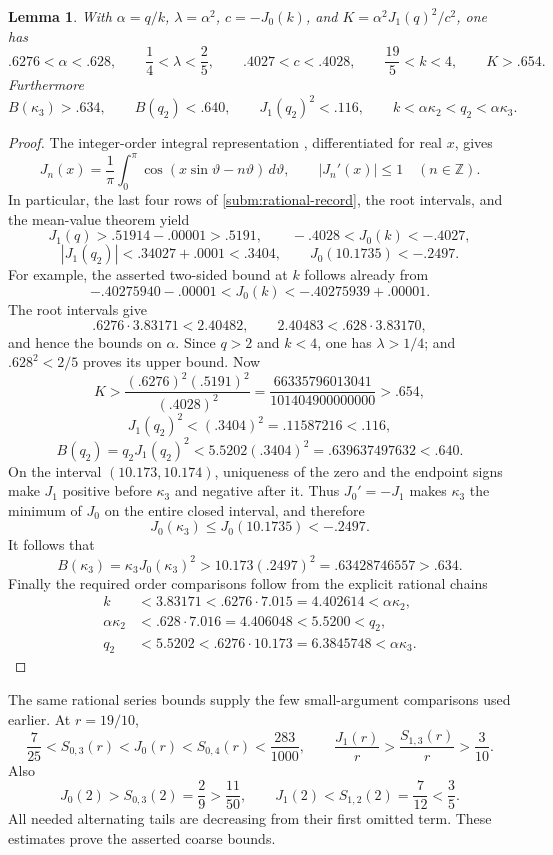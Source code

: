 \documentclass[11pt]{article}
\newtheorem{lemma}[theorem]{Lemma}
\theoremstyle{remark}
\begin{document}
\begin{lemma}\label{gm:coarse}
With $\alpha=q/k$, $\lambda=\alpha^2$, $c=-J_0(k)$, and
$K=\alpha^2J_1(q)^2/c^2$, one has
\[
 .6276<\alpha<.628,\qquad \frac14<\lambda<\frac25,
 \qquad .4027<c<.4028,\qquad \frac{19}5<k<4,
 \qquad K>.654.
\]
Furthermore
\[
 B(\kappa_3)>.634,\qquad B(q_2)<.640,\qquad
 J_1(q_2)^2<.116,
 \qquad k<\alpha\kappa_2<q_2<\alpha\kappa_3.
\]
\end{lemma}
\begin{proof}
The integer-order integral representation
\cite[Eq.~10.9.2]{DLMF}, differentiated for real $x$, gives
\[
 J_n(x)=\frac1\pi\int_0^\pi
       \cos(x\sin\vartheta-n\vartheta)\,d\vartheta,
 \qquad |J_n'(x)|\le1\quad(n\in\mathbb Z).
\]
In particular, the last four rows of
\eqref{subm:rational-record}, the root intervals, and the mean-value
theorem yield
\[
 J_1(q)>.51914-.00001>.5191,\qquad
 -.4028<J_0(k)<-.4027,
\]
\[
 |J_1(q_2)|<.34027+.0001<.3404,\qquad
 J_0(10.1735)<-.2497.
\]
For example, the asserted two-sided bound at $k$ follows already from
\[
 -.40275940-.00001<J_0(k)
                  <-.40275939+.00001.
\]
The root intervals give
\[
 .6276\cdot3.83171<2.40482,
 \qquad 2.40483<.628\cdot3.83170,
\]
and hence the bounds on $\alpha$.  Since $q>2$ and $k<4$, one has
$\lambda>1/4$; and $.628^2<2/5$ proves its upper bound.  Now
\[
 K>\frac{(.6276)^2(.5191)^2}{(.4028)^2}
 =\frac{66335796013041}{101404900000000}>.654,
\]
\[
 J_1(q_2)^2<(.3404)^2=.11587216<.116,
\]
\[
 B(q_2)=q_2J_1(q_2)^2
 <5.5202(.3404)^2=.639637497632<.640.
\]
On the interval $(10.173,10.174)$, uniqueness of the zero and the
endpoint signs make $J_1$ positive before $\kappa_3$ and negative
after it.  Thus $J_0'=-J_1$ makes $\kappa_3$ the minimum of $J_0$
on the entire closed interval, and therefore
\[
 J_0(\kappa_3)\le J_0(10.1735)<-.2497.
\]
It follows that
\[
 B(\kappa_3)=\kappa_3J_0(\kappa_3)^2
 >10.173(.2497)^2=.63428746557>.634.
\]
Finally the required order comparisons follow from the explicit
rational chains
\[
\begin{aligned}
 k&<3.83171<.6276\cdot7.015=4.402614<\alpha\kappa_2,\\
 \alpha\kappa_2&<.628\cdot7.016=4.406048<5.5200<q_2,\\
 q_2&<5.5202<.6276\cdot10.173=6.3845748<\alpha\kappa_3.
\end{aligned}
\]
\end{proof}

The same rational series bounds supply the few small-argument
comparisons used earlier.  At $r=19/10$,
\[
 \frac7{25}<S_{0,3}(r)<J_0(r)<S_{0,4}(r)
 <\frac{283}{1000},\qquad
 \frac{J_1(r)}r>\frac{S_{1,3}(r)}r>\frac3{10}.
\]
Also
\[
 J_0(2)>S_{0,3}(2)=\frac29>\frac{11}{50},\qquad
 J_1(2)<S_{1,2}(2)=\frac7{12}<\frac35.
\]
All needed alternating tails are decreasing from their first omitted
term.  These estimates prove the asserted coarse bounds.
\end{document}
